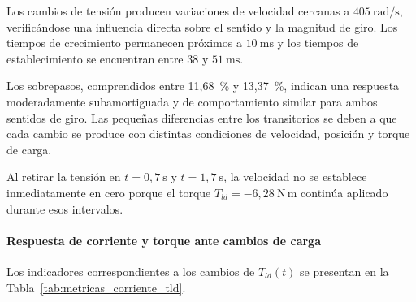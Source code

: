 \documentclass[10pt,a4paper]{article}
\begin{document}
\begin{table}[H]
	\centering
	\caption{Indicadores de la respuesta de velocidad ante cambios de $v_{qs}^{r}(t)$.}
	\label{tab:metricas_velocidad_vqs}
	
	\scriptsize
\end{table}

Los cambios de tensión producen variaciones de velocidad cercanas a
$405~\mathrm{rad/s}$, verificándose una influencia directa sobre el sentido
y la magnitud de giro. Los tiempos de crecimiento permanecen próximos a
$10~\mathrm{ms}$ y los tiempos de establecimiento se encuentran entre
$38$ y $51~\mathrm{ms}$.

Los sobrepasos, comprendidos entre 11,68~\% y 13,37~\%, indican una
respuesta moderadamente subamortiguada y de comportamiento similar para
ambos sentidos de giro. Las pequeñas diferencias entre los transitorios se
deben a que cada cambio se produce con distintas condiciones de velocidad,
posición y torque de carga.

Al retirar la tensión en $t=0,7~\mathrm{s}$ y $t=1,7~\mathrm{s}$, la
velocidad no se establece inmediatamente en cero porque el torque
$T_{ld}=-6,28~\mathrm{N\,m}$ continúa aplicado durante esos intervalos.

\paragraph{Respuesta de corriente y torque ante cambios de carga}

Los indicadores correspondientes a los cambios de $T_{ld}(t)$ se presentan
en la Tabla~\ref{tab:metricas_corriente_tld}.
\end{document}
